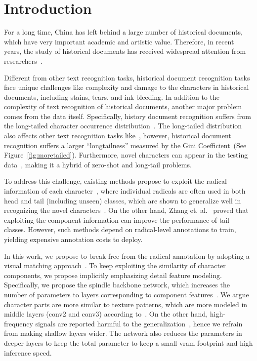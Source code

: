 \section{Introduction}

For a long time, China has left behind a large number of historical documents, which have very important academic and artistic value. 
Therefore, in recent years, the study of historical documents has received widespread attention from researchers~\cite{jinic21,hde,obc306}. 

Different from other text recognition tasks, historical document recognition tasks face unique challenges like complexity and damage to the characters in historical documents, including stains, tears, and ink bleeding. 
In addition to the complexity of text recognition of historical documents, another major problem comes from the data itself. Specifically, history document recognition suffers from the long-tailed character occurrence distribution~\cite{obcmk2}. 
The long-tailed distribution also affects other text recognition tasks like~\cite{fudanvi}, however, historical document recognition suffers a larger ``longtailness'' measured by the Gini Coefficient~\cite{tailsurvey}(See Figure~\ref{fig:moretailed}). 
Furthermore, novel characters can appear in the testing data~\cite{jinic21}, making it a hybrid of zero-shot and long-tail problems.



To address this challenge, existing methods propose to exploit the radical information of each character~\cite{denseran}, where individual radicals are often used in both head and tail (including unseen) classes, which are shown to generalize well in recognizing the novel characters~\cite{fewran,zhang20pr}.
On the other hand, Zhang et. al.~\cite{sanicdar23}  proved that exploiting the component information can improve the performance of tail classes.
However, such methods depend on radical-level annotations to train, yielding expensive annotation costs to deploy.

In this work, we propose to break free from the radical annotation by adopting a visual matching approach~\cite{vsdf}. 
To keep exploiting the similarity of character components, we propose implicitly emphasizing detail feature modeling.  
Specifically, we propose the spindle backbone network, which increases the number of parameters to layers corresponding to component features~\cite{mobile}. 
We argue character parts are more similar to texture patterns, which are more modeled in middle layers (conv2 and conv3) according to~\cite{dissection}.
On the other hand, high-frequency signals are reported harmful to the generalization~\cite{hfharm,hffilter}, hence we refrain from making shallow layers wider. 
The network also reduces the parameters in deeper layers to keep the total parameter to keep a small vram footprint and high inference speed.

